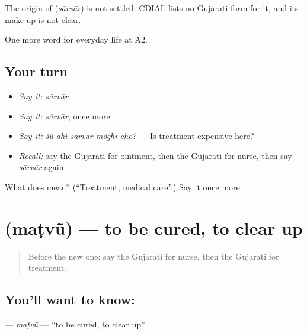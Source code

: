 \begin{cousinweb}
The origin of \textbf{} (\emph{sārvār}) is not settled: CDIAL lists no Gujarati form for it, and its make-up is not clear.
\end{cousinweb}

\begin{grammarlens}[title={What you've built}]
One more word for everyday life at A2.
\end{grammarlens}

\subsection*{Your turn}
\begin{itemize}
\raggedright
  \item \emph{Say it:} \emph{sārvār}
  \item \emph{Say it:} \emph{sārvār}, once more
  \item \emph{Say it:} \emph{śũ ahī̃ sārvār mõghī che?} — Is treatment expensive here?
  \item \emph{Recall:} say the Gujarati for ointment, then the Gujarati for nurse, then say \emph{sārvār} again
\end{itemize}

\begin{tcolorbox}[breakable,colback=teal!4,colframe=teal!35!black,title={Before you move on}]
What does  mean? (\textquotedblleft{}Treatment, medical care\textquotedblright{}.) Say it once more.
\end{tcolorbox}
\section[\texorpdfstring{\gu{મટવું} (maṭvũ)}{મટવું (maṭvũ)}]{ (maṭvũ) — to be cured, to clear up}

\label{lesson:GU-C231-matvu}



\begin{quote}
Before the new one: say the Gujarati for nurse, then the Gujarati for treatment.
\end{quote}

\subsection*{You'll want to know: }
\textbf{} — \emph{maṭvũ} — \textquotedblleft{}to be cured, to clear up\textquotedblright{}.

